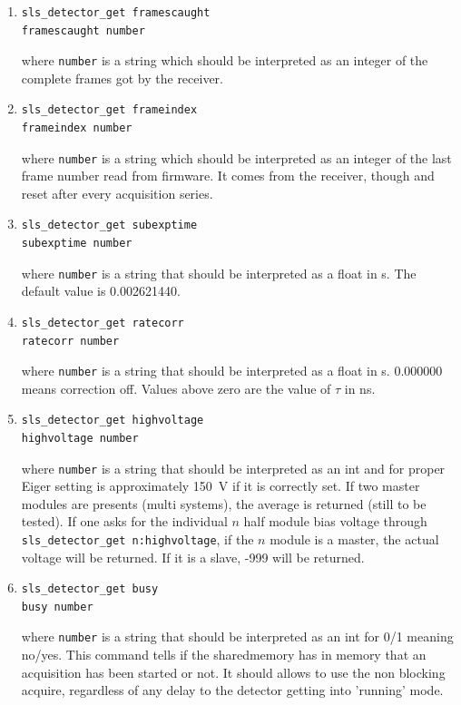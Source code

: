 \documentclass{article}
\begin{document}
{{{\begin{enumerate}
\item \begin{verbatim}
sls_detector_get framescaught
framescaught number
\end{verbatim}
where {\tt{number}} is a string which should be interpreted as an integer of the complete frames got by the receiver.

\item \begin{verbatim}
sls_detector_get frameindex
frameindex number
\end{verbatim}
where {\tt{number}} is a string which should be interpreted as an integer of the last frame number read from firmware. It comes from the receiver, though and reset after every acquisition series.

\item \begin{verbatim}
sls_detector_get subexptime
subexptime number
\end{verbatim}
where {\tt{number}} is a string that should be interpreted as a float in s. The default value is 0.002621440. 

\item \begin{verbatim}
sls_detector_get ratecorr
ratecorr number
\end{verbatim}
where {\tt{number}} is a string that should be interpreted as a float in s.  0.000000 means correction off. Values above zero are the value of $\tau$ in ns.

\item \begin{verbatim}
sls_detector_get highvoltage
highvoltage number
\end{verbatim}
where {\tt{number}} is a string that should be interpreted as an int and for proper Eiger setting is approximately 150~V if it is correctly set. If two master modules are presents (multi systems), the average is returned (still to be tested). If one asks for the individual $n$ half module bias voltage through {\tt{sls\_detector\_get n:highvoltage}}, if the $n$ module is a master, the actual voltage will be returned. If it is a slave, -999 will be returned. 
  
\item \begin{verbatim}
sls_detector_get busy
busy number
\end{verbatim}
where  {\tt{number}} is a string that should be interpreted as an int for 0/1 meaning no/yes. This command tells if the sharedmemory has in memory that an acquisition has been started or not. It should allows to use the non blocking acquire, regardless of any delay to the detector getting into 'running' mode. 



\end{enumerate}}}}
\end{document}
